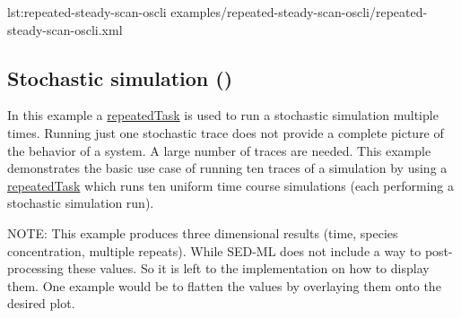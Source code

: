 {lst:repeated-steady-scan-oscli}
{examples/repeated-steady-scan-oscli/repeated-steady-scan-oscli.xml}


\subsection{Stochastic simulation ()}
In this example a \hyperref[class:repeatedTask]{repeatedTask} is used to run a stochastic simulation multiple times.
Running just one stochastic trace does not provide a complete picture of the behavior of a system. A large number of traces are needed. This example demonstrates the basic use case of running ten traces of a simulation by using a \hyperref[class:repeatedTask]{repeatedTask} which runs ten uniform time course simulations (each performing a stochastic simulation run).

NOTE: This example produces three dimensional results (time, species concentration, multiple repeats). While SED-ML \currentLV does not include a way to post-processing these values. So it is left to the implementation on how to display them. One example would be to flatten the values by overlaying them onto the desired plot. 


